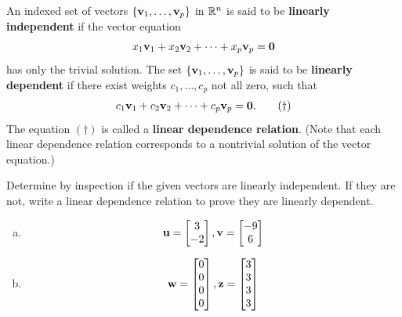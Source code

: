 \begin{boxdef}
	An indexed set of vectors $\{\boldsymbol{\mathbf{v}}_1,\ldots,\boldsymbol{\mathbf{v}}_p\}$ in $\mathbb{R}^n$ is said to be \textbf{linearly independent} if the vector equation
	$$ x_1\boldsymbol{\mathbf{v}}_1 + x_2\boldsymbol{\mathbf{v}}_2 + \cdots + x_p\boldsymbol{\mathbf{v}}_p = \boldsymbol{\mathbf{0}} $$
	has only the trivial solution. The set $\{\boldsymbol{\mathbf{v}}_1,\ldots,\boldsymbol{\mathbf{v}}_p\}$ is said to be \textbf{linearly dependent} if there exist weights $c_1,\ldots,c_p$ not all zero, such that
	\begin{align*}
	c_1\boldsymbol{\mathbf{v}}_1 + c_2\boldsymbol{\mathbf{v}}_2 + \cdots + c_p\boldsymbol{\mathbf{v}}_p = \boldsymbol{\mathbf{0}}. \tag{\dag}
	\end{align*}
	The equation $(\dag)$ is called a \textbf{linear dependence relation}. (Note that each linear dependence relation corresponds to a nontrivial solution of the vector equation.)
\end{boxdef}

\begin{exercise} %
	Determine by inspection if the given vectors are linearly independent. If they are not, write a linear dependence relation to prove they are linearly dependent.
	\begin{multicols}{2}
		\begin{enumerate}[(a)]
			\item $$\boldsymbol{\mathbf{u}}=\begin{bmatrix}3\\-2\end{bmatrix}, \boldsymbol{\mathbf{v}}=\begin{bmatrix}-9\\6\end{bmatrix}$$
			\item $$\boldsymbol{\mathbf{w}}=\begin{bmatrix}0\\0\\0\\0\end{bmatrix}, \boldsymbol{\mathbf{z}}=\begin{bmatrix}3\\3\\3\\3\end{bmatrix}$$
		\end{enumerate}
	\end{multicols}
\end{exercise}
\vfill


